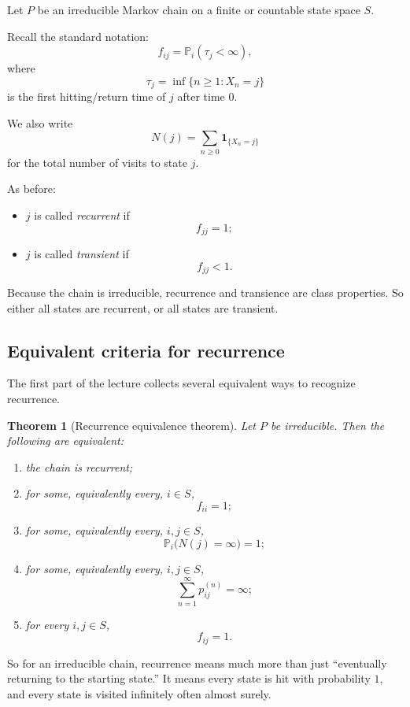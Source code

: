 \documentclass[11pt]{article}
\newtheorem{theorem}{Theorem}[section]
\theoremstyle{definition}
\begin{document}
Let \(P\) be an irreducible Markov chain on a finite or countable state space \(S\).

Recall the standard notation:
\[
f_{ij}=\mathbb P_i(\tau_j<\infty),
\]
where
\[
\tau_j=\inf\{n\ge 1:X_n=j\}
\]
is the first hitting/return time of \(j\) after time \(0\).

We also write
\[
N(j)=\sum_{n\ge 0}\mathbf 1_{\{X_n=j\}}
\]
for the total number of visits to state \(j\).

As before:
\begin{itemize}[leftmargin=2em]
    \item \(j\) is called \emph{recurrent} if
    \[
    f_{jj}=1;
    \]
    \item \(j\) is called \emph{transient} if
    \[
    f_{jj}<1.
    \]
\end{itemize}

Because the chain is irreducible, recurrence and transience are class properties. So either all states are recurrent, or all states are transient.

\subsection{Equivalent criteria for recurrence}

The first part of the lecture collects several equivalent ways to recognize recurrence.

\begin{theorem}[Recurrence equivalence theorem]
Let \(P\) be irreducible. Then the following are equivalent:
\begin{enumerate}[label=\arabic*.]
    \item the chain is recurrent;
    \item for some, equivalently every, \(i\in S\),
    \[
    f_{ii}=1;
    \]
    \item for some, equivalently every, \(i,j\in S\),
    \[
    \mathbb P_i\bigl(N(j)=\infty\bigr)=1;
    \]
    \item for some, equivalently every, \(i,j\in S\),
    \[
    \sum_{n=1}^{\infty} p_{ij}^{(n)}=\infty;
    \]
    \item for every \(i,j\in S\),
    \[
    f_{ij}=1.
    \]
\end{enumerate}
\end{theorem}

So for an irreducible chain, recurrence means much more than just ``eventually returning to the starting state.'' It means every state is hit with probability \(1\), and every state is visited infinitely often almost surely.
\end{document}
